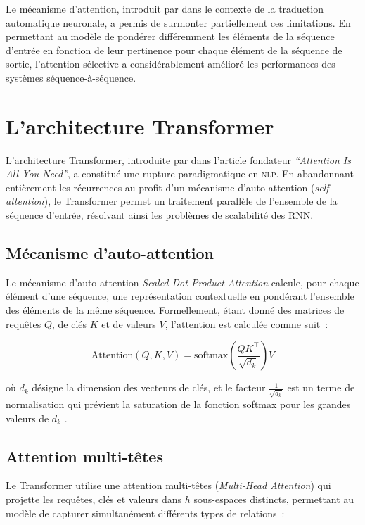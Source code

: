 \documentclass[12pt,a4paper,oneside]{report}
\newcommand{\nlp}{\textsc{nlp}}
\begin{document}
Le mécanisme d'attention, introduit par \citet{bahdanau2015} dans le contexte de la traduction automatique neuronale, a permis de surmonter partiellement ces limitations. En permettant au modèle de pondérer différemment les éléments de la séquence d'entrée en fonction de leur pertinence pour chaque élément de la séquence de sortie, l'attention sélective a considérablement amélioré les performances des systèmes séquence-à-séquence.

\section{L'architecture Transformer}
\label{sec:transformer}

L'architecture Transformer, introduite par \citet{vaswani2017} dans l'article fondateur \textit{``Attention Is All You Need''}, a constitué une rupture paradigmatique en \nlp{}. En abandonnant entièrement les récurrences au profit d'un mécanisme d'auto-attention (\textit{self-attention}), le Transformer permet un traitement parallèle de l'ensemble de la séquence d'entrée, résolvant ainsi les problèmes de scalabilité des RNN.

\subsection{Mécanisme d'auto-attention}

Le mécanisme d'auto-attention \textit{Scaled Dot-Product Attention} calcule, pour chaque élément d'une séquence, une représentation contextuelle en pondérant l'ensemble des éléments de la même séquence. Formellement, étant donné des matrices de requêtes $Q$, de clés $K$ et de valeurs $V$, l'attention est calculée comme suit~:

\begin{equation}
\text{Attention}(Q, K, V) = \text{softmax}\left(\frac{QK^\top}{\sqrt{d_k}}\right)V
\label{eq:attention}
\end{equation}

\noindent où $d_k$ désigne la dimension des vecteurs de clés, et le facteur $\frac{1}{\sqrt{d_k}}$ est un terme de normalisation qui prévient la saturation de la fonction softmax pour les grandes valeurs de $d_k$ \citep{vaswani2017}.

\subsection{Attention multi-têtes}

Le Transformer utilise une attention multi-têtes (\textit{Multi-Head Attention}) qui projette les requêtes, clés et valeurs dans $h$ sous-espaces distincts, permettant au modèle de capturer simultanément différents types de relations~:
\end{document}
